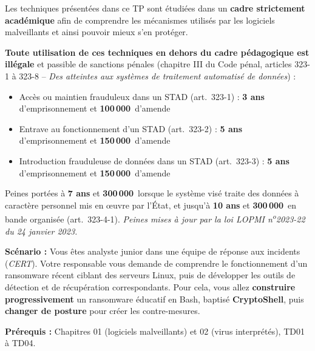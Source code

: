 \documentclass[a4paper,11pt]{article}
\theoremstyle{plain}
\theoremstyle{definition}
\begin{document}
\begin{ethique}
Les techniques présentées dans ce TP sont étudiées dans un \textbf{cadre strictement académique} afin de comprendre les mécanismes utilisés par les logiciels malveillants et ainsi pouvoir mieux s'en protéger.

\textbf{Toute utilisation de ces techniques en dehors du cadre pédagogique est illégale} et passible de sanctions pénales (chapitre III du Code pénal, articles 323-1 à 323-8 -- \textit{Des atteintes aux systèmes de traitement automatisé de données}) :
\begin{itemize}
    \item Accès ou maintien frauduleux dans un STAD (art.~323-1) : \textbf{3 ans} d'emprisonnement et \textbf{100\,000\,\texteuro{}} d'amende
    \item Entrave au fonctionnement d'un STAD (art.~323-2) : \textbf{5 ans} d'emprisonnement et \textbf{150\,000\,\texteuro{}} d'amende
    \item Introduction frauduleuse de données dans un STAD (art.~323-3) : \textbf{5 ans} d'emprisonnement et \textbf{150\,000\,\texteuro{}} d'amende
\end{itemize}
Peines portées à \textbf{7 ans} et \textbf{300\,000\,\texteuro{}} lorsque le système visé traite des données à caractère personnel mis en \oe uvre par l'État, et jusqu'à \textbf{10 ans} et \textbf{300\,000\,\texteuro{}} en bande organisée (art.~323-4-1). \textit{Peines mises à jour par la loi LOPMI n\textsuperscript{o}2023-22 du 24 janvier 2023.}
\end{ethique}

\bigskip


\noindent
\textbf{Scénario :} Vous êtes analyste junior dans une équipe de réponse aux incidents (\textit{CERT}). Votre responsable vous demande de comprendre le fonctionnement d'un ransomware récent ciblant des serveurs Linux, puis de développer les outils de détection et de récupération correspondants. Pour cela, vous allez \textbf{construire progressivement} un ransomware éducatif en Bash, baptisé \textbf{CryptoShell}, puis \textbf{changer de posture} pour créer les contre-mesures.

\medskip
\noindent\textbf{Prérequis :} Chapitres 01 (logiciels malveillants) et 02 (virus interprétés), TD01 à TD04.
\end{document}
